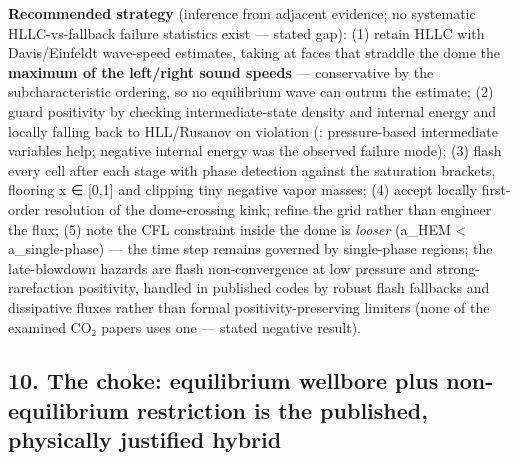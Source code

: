 \textbf{Recommended strategy} (inference from adjacent evidence; no
systematic HLLC-vs-fallback failure statistics exist --- stated gap):
(1) retain HLLC with Davis/Einfeldt wave-speed estimates, taking at
faces that straddle the dome the \textbf{maximum of the left/right sound
speeds} --- conservative by the subcharacteristic ordering, so no
equilibrium wave can outrun the estimate; (2) guard positivity by
checking intermediate-state density and internal energy and locally
falling back to HLL/Rusanov on violation (\citealp{log2021}: pressure-based intermediate variables help; negative internal energy was the observed
failure mode); (3) flash every cell after each stage with phase
detection against the saturation brackets, flooring x ∈ {[}0,1{]} and
clipping tiny negative vapor masses; (4) accept locally first-order
resolution of the dome-crossing kink; refine the grid rather than
engineer the flux; (5) note the CFL constraint inside the dome is
\emph{looser} (a\_HEM \textless{} a\_single-phase) --- the time step
remains governed by single-phase regions; the late-blowdown hazards are
flash non-convergence at low pressure and strong-rarefaction positivity,
handled in published codes by robust flash fallbacks and dissipative
fluxes rather than formal positivity-preserving limiters (none of the
examined CO₂ papers uses one --- stated negative result).

\hypertarget{the-choke-equilibrium-wellbore-plus-non-equilibrium-restriction-is-the-published-physically-justified-hybrid}{%
\subsection{10. The choke: equilibrium wellbore plus non-equilibrium
restriction is the published, physically justified
hybrid}\label{the-choke-equilibrium-wellbore-plus-non-equilibrium-restriction-is-the-published-physically-justified-hybrid}}

